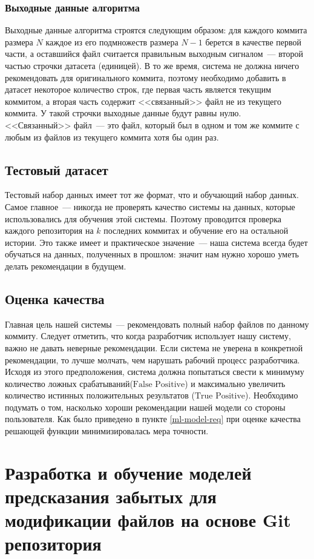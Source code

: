     \subsubsection{Выходные данные алгоритма}\label{related-files-intro}
 Выходные данные алгоритма строятся следующим образом: для каждого коммита размера $N$ каждое из его подмножеств размера $N - 1$ берется в качестве первой части, а оставшийся файл считается правильным выходным сигналом~--- второй частью строчки датасета (единицей). В то же время, система не должна ничего рекомендовать для оригинального коммита, поэтому необходимо добавить в датасет некоторое количество строк, где первая часть является текущим коммитом, а вторая часть содержит <<связанный>> файл не из текущего коммита. У такой строчки выходные данные будут равны нулю. <<Связанный>> файл~--- это файл, который был в одном и том же коммите с любым из файлов из текущего коммита хотя бы один раз.
    \subsection{Тестовый датасет}
Тестовый набор данных имеет тот же формат, что и обучающий набор данных. Самое главное~--- никогда не проверять качество системы на данных, которые использовались для обучения этой системы. Поэтому проводится проверка каждого репозитория на $k$ последних коммитах и обучение его на остальной истории. Это также имеет и практическое значение~--- наша система всегда будет обучаться на данных, полученных в прошлом: значит нам нужно хорошо уметь делать рекомендации в будущем.
    \subsection{Оценка качества}
Главная цель нашей системы~--- рекомендовать полный набор файлов по данному коммиту. Следует отметить, что когда разработчик использует нашу систему, важно не давать неверные рекомендации. Если система не уверена в конкретной рекомендации, то лучше молчать, чем нарушать рабочий процесс разработчика. Исходя из этого предположения, система должна попытаться свести к минимуму количество ложных срабатываний($\text{False Positive}$) и максимально увеличить количество истинных положительных результатов ($\text{True Positive}$). Необходимо подумать о том, насколько хороши рекомендации нашей модели со стороны пользователя. Как было приведено в пункте \ref{ml-model-req} при оценке качества решающей функции минимизировалась мера точности.

\section{Разработка и обучение моделей предсказания забытых для модификации файлов на основе Git репозитория}
